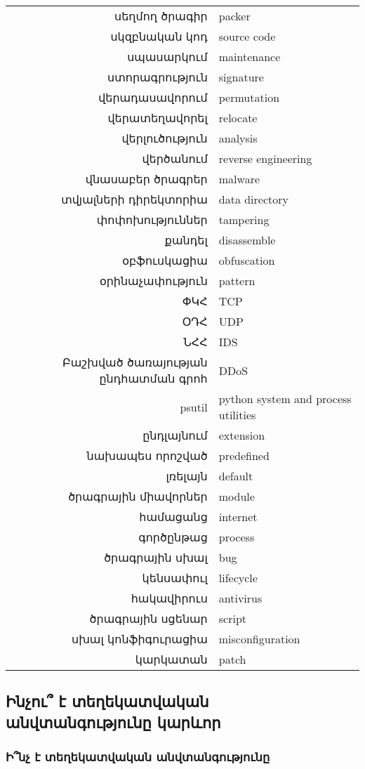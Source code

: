 \documentclass[10pt]{article}
\begin{document}
\begin{sloppypar}
\begin{tabular}{rl}
սեղմող ծրագիր&packer \\
սկզբնական կոդ&source code \\
սպասարկում&maintenance \\
ստորագրություն&signature \\
վերադասավորում&permutation \\
վերատեղավորել&relocate \\
վերլուծություն&analysis \\
վերծանում&reverse engineering \\
վնասաբեր ծրագրեր&malware \\
տվյալների դիրեկտորիա&data directory \\
փոփոխություններ&tampering \\
քանդել&disassemble \\
օբֆուսկացիա&obfuscation \\
օրինաչափություն&pattern \\
ՓԿՀ&TCP \\
ՕԴՀ&UDP \\
ՆՀՀ&IDS \\
Բաշխված ծառայության ընդհատման գրոհ&DDoS \\
psutil&python system and process utilities \\
ընդլայնում&extension \\
նախապես որոշված&predefined \\
լռելայն&default \\
ծրագրային միավորներ&module \\
համացանց&internet \\
գործընթաց&process \\
ծրագրային սխալ&bug \\
կենսափուլ&lifecycle \\
հակավիրուս&antivirus \\
ծրագրային սցենար&script \\
սխալ կոնֆիգուրացիա&misconfiguration \\
կարկատան&patch \\
\end{tabular}


\subsection{Ինչու՞ է տեղեկատվական անվտանգությունը կարևոր}


\subsubsection{Ի՞նչ է տեղեկատվական անվտանգությունը}


\end{sloppypar}
\end{document}
